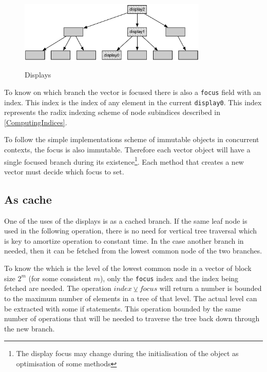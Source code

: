 \begin{figure}[h!]
  \centering
  \includegraphics[width=0.8\textwidth]{Figures/Displays}
  \label{Displays}
  \caption{Displays}
\end{figure}

To know on which branch the vector is focused there is also a \texttt{focus} field with an index. This index is the index of any element in the current \texttt{display0}. This index represents the radix indexing scheme of node subindices described in \ref{ComputingIndices}.

To follow the simple implementations scheme of immutable objects in concurrent contexts, the focus is also immutable. Therefore each vector object will have a single focused branch during its existence\footnote{The display focus may change during the initialisation of the object as optimisation of some methods}. Each method that creates a new vector must decide which focus to set. 


\subsection{As cache}
One of the uses of the displays is as a cached branch. If the same leaf node is used in the following operation, there is no need for vertical tree traversal which is key to amortize operation to constant time. In the case another branch in needed, then it can be fetched from the lowest common node of the two branches. 

To know the which is the level of the lowest common node in a vector of block size $2^m$ (for some consistent $m$), only the \texttt{focus} index and the index being fetched are needed. The operation $index \veebar focus$ will return a number is bounded to the maximum number of elements in a tree of that level. The actual level can be extracted with some if statements. This operation bounded by the same number of operations that will be needed to traverse the tree back down through the new branch.

